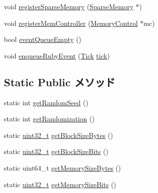 \begin{DoxyCompactItemize}
\item 
void \hyperlink{classRubySystem_a7eb79d5477e1c2026d9b1d8b6e26112b}{registerSparseMemory} (\hyperlink{classSparseMemory}{SparseMemory} $\ast$)
\item 
void \hyperlink{classRubySystem_ac9de1de608e144dd7905a56770e60bfc}{registerMemController} (\hyperlink{classMemoryControl}{MemoryControl} $\ast$mc)
\item 
bool \hyperlink{classRubySystem_a89b51bcc3a463cd78acf62b3fc66288f}{eventQueueEmpty} ()
\item 
void \hyperlink{classRubySystem_a14b5a6783cc1c4f01aef58ab8ddaf46e}{enqueueRubyEvent} (\hyperlink{base_2types_8hh_a5c8ed81b7d238c9083e1037ba6d61643}{Tick} \hyperlink{classClockedObject_a4daae57fbf09ee5423d123f5ce330e92}{tick})
\end{DoxyCompactItemize}
\subsection*{Static Public メソッド}
\begin{DoxyCompactItemize}
\item 
static int \hyperlink{classRubySystem_aed9d96608b2dca650ff1cece99ace997}{getRandomSeed} ()
\item 
static int \hyperlink{classRubySystem_a2c9e274659748daf59b6e960456cea85}{getRandomization} ()
\item 
static \hyperlink{Type_8hh_a435d1572bf3f880d55459d9805097f62}{uint32\_\-t} \hyperlink{classRubySystem_ad5726e8c9283b1447b75c3a8c67ffa75}{getBlockSizeBytes} ()
\item 
static \hyperlink{Type_8hh_a435d1572bf3f880d55459d9805097f62}{uint32\_\-t} \hyperlink{classRubySystem_a2b48f2ef758982094ea9fd3a70cf078b}{getBlockSizeBits} ()
\item 
static uint64\_\-t \hyperlink{classRubySystem_a736ae287325afa244eda540419cdd90c}{getMemorySizeBytes} ()
\item 
static \hyperlink{Type_8hh_a435d1572bf3f880d55459d9805097f62}{uint32\_\-t} \hyperlink{classRubySystem_a30259c41e1b009b45c094bccf585dab3}{getMemorySizeBits} ()
\end{DoxyCompactItemize}
